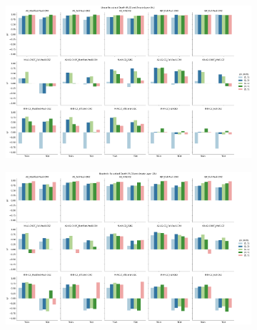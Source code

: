 \documentclass[journal=jacsat,manuscript=article]{achemso}
\begin{document}
\begin{figure}[H]
	\centering	
	\begin{subfigure}[b]{0.49\textwidth}
		\centering
		\includegraphics[width=\linewidth]{../images/Function_Fitting/sixteenqubit/16qubit_Linear_RUD_AL}
		\caption{}
		\label{fig:16qubit_Linear_RUD_AL}
	\end{subfigure}
	\hfill	
	\begin{subfigure}[b]{0.49\textwidth}
		\centering
		\includegraphics[width=\linewidth]{../images/Function_Fitting/sixteenqubit/16qubit_Quadratic_RUD_AL}
		\caption{}
		\label{fig:16qubit_Quadratic_RUD_AL}
	\end{subfigure}
	\hfill

\end{figure}
\end{document}
